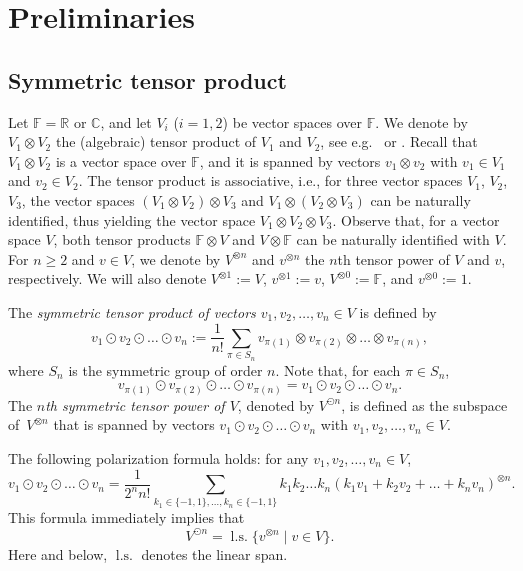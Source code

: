 \documentclass[12pt]{article}
\theoremstyle{remark}
\theoremstyle{remark}
\theoremstyle{remark}
\begin{document}
   
\section{Preliminaries}\label{gfxsthshtj}

\subsection{Symmetric tensor product}

Let $\mathbb F=\mathbb R$ or $\mathbb C$, and let $V_i$ ($i=1,2$) be vector spaces over $\mathbb F$. We denote by $V_1\otimes V_2$ the (algebraic) tensor product of $V_1$ and $V_2$, see e.g.\ \cite[Chapter~14]{Roman_Algebra} or \cite[Chapter~1]{Ryan}. Recall that $V_1\otimes V_2$ is a vector space over $\mathbb F$, and it is spanned by  vectors $v_1\otimes v_2$ with $v_1\in V_1$ and $v_2\in V_2$. The tensor product is associative, i.e., for three vector spaces $V_1$, $V_2$, $V_3$, the vector spaces $(V_1\otimes V_2)\otimes V_3$ and $V_1\otimes(V_2\otimes V_3)$ can be naturally identified, thus yielding the vector space $V_1\otimes V_2\otimes V_3$.  Observe that, for a vector space $V$, both tensor products $\mathbb F\otimes V$ and $V \otimes\mathbb F$ can be naturally identified with $V$. 
For $n\ge2$ and $v\in V$, we denote by $V^{\otimes n}$ and $v^{\otimes n}$ the  $n$th tensor power of $V$ and $v$, respectively.   We will also denote $V^{\otimes 1}:=V$, $v^{\otimes 1}:=v$, $V^{\otimes 0}:=\mathbb F$, and $v^{\otimes 0}:=1$. 

The {\it symmetric tensor product of vectors $v_1,v_2,\dots,v_n\in V$} is defined by
$$v_1\odot v_2\odot\dots\odot v_n:=\frac1{n!}\sum_{\pi\in S_n}v_{\pi(1)}\otimes v_{\pi(2)}\otimes \dots \otimes v_{\pi(n)},$$
where $S_n$ is the symmetric group of order $n$.  
Note that, for each $\pi\in S_n$,
\begin{equation}\label{xeras4waq53y}
v_{\pi(1)}\odot v_{\pi(2)}\odot\dots\odot v_{\pi(n)}=v_1\odot v_2\odot\dots\odot v_n.
\end{equation}
The {\it $n$th symmetric tensor power of $V$}, denoted by $V^{\odot n}$, is defined as the subspace 
of~$V^{\otimes n}$  that is spanned by vectors $v_1\odot v_2\odot\dots\odot v_n$ with  $v_1,v_2,\dots,v_n\in V$. 

The following polarization formula holds: for any $v_1,v_2,\dots,v_n\in V$,
\[
v_1\odot v_2\odot \dots\odot v_n=\frac{1}{2^{n}n!} \sum_{ k_1 \in\{-1,1\}, \ldots,  k_n \in\{-1,1\}} k_1 k_2 \dots k_n (k_1 v_1+k_2 v_2 + \dots + k_n v_n)^{\otimes n}.
\]
 This formula immediately implies that
 \begin{equation}\label{cxtuewu533}
V^{\odot    n}=\operatorname{l.s.}\{v^{\otimes n}\mid v\in V\}.
\end{equation}
Here and below,  $\operatorname{l.s.}$ denotes the linear span.
\end{document}
